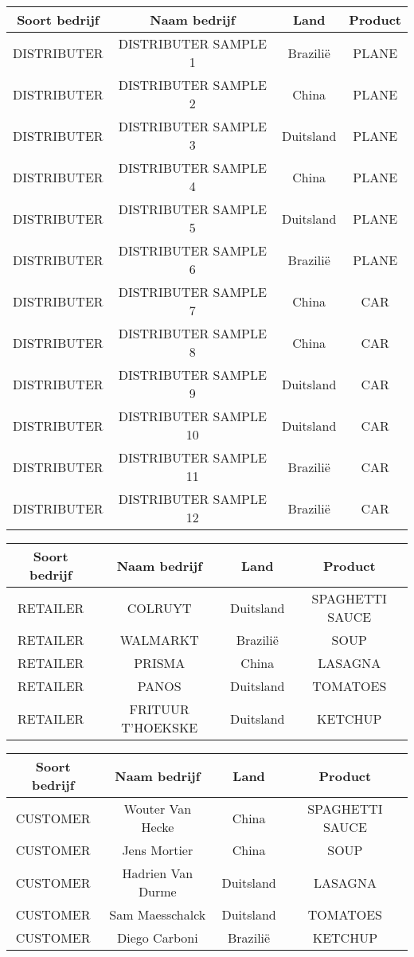 \begin{center}
	\begin{tabular}{ | c | c | c | c |}
		\hline
		\textbf{Soort bedrijf} & \textbf{Naam bedrijf} & \textbf{Land} & \textbf{Product} \\ \hline
		DISTRIBUTER & DISTRIBUTER SAMPLE 1 & Brazilië & PLANE \\ \hline
		DISTRIBUTER & DISTRIBUTER SAMPLE 2 & China & PLANE \\ \hline
		DISTRIBUTER & DISTRIBUTER SAMPLE 3 & Duitsland & PLANE \\ \hline
		DISTRIBUTER & DISTRIBUTER SAMPLE 4 & China & PLANE \\ \hline
		DISTRIBUTER & DISTRIBUTER SAMPLE 5 & Duitsland & PLANE \\ \hline
		DISTRIBUTER & DISTRIBUTER SAMPLE 6 & Brazilië & PLANE \\ \hline
		DISTRIBUTER & DISTRIBUTER SAMPLE 7 & China & CAR \\ \hline
		DISTRIBUTER & DISTRIBUTER SAMPLE 8 & China & CAR \\ \hline
		DISTRIBUTER & DISTRIBUTER SAMPLE 9 & Duitsland & CAR \\ \hline
		DISTRIBUTER & DISTRIBUTER SAMPLE 10 & Duitsland & CAR \\ \hline
		DISTRIBUTER & DISTRIBUTER SAMPLE 11 & Brazilië & CAR \\ \hline
		DISTRIBUTER & DISTRIBUTER SAMPLE 12 & Brazilië & CAR \\ \hline
	\end{tabular}
\end{center}
\begin{center}
	\begin{tabular}{ | c | c | c | c |}
		\hline
		\textbf{Soort bedrijf} & \textbf{Naam bedrijf} & \textbf{Land} & \textbf{Product} \\ \hline
		RETAILER & COLRUYT  & Duitsland & SPAGHETTI SAUCE \\ \hline
		RETAILER & WALMARKT  & Brazilië & SOUP \\ \hline
		RETAILER & PRISMA  & China & LASAGNA \\ \hline
		RETAILER & PANOS  & Duitsland & TOMATOES \\ \hline
		RETAILER & FRITUUR T'HOEKSKE  & Duitsland & KETCHUP \\ \hline
	\end{tabular}
\end{center}
\begin{center}
	\begin{tabular}{ | c | c | c | c |}
		\hline
		\textbf{Soort bedrijf} & \textbf{Naam bedrijf} & \textbf{Land} & \textbf{Product} \\ \hline
		CUSTOMER & Wouter Van Hecke  & China & SPAGHETTI SAUCE \\ \hline
		CUSTOMER & Jens Mortier  & China & SOUP \\ \hline
		CUSTOMER & Hadrien Van Durme  & Duitsland & LASAGNA \\ \hline
		CUSTOMER & Sam Maesschalck  & Duitsland & TOMATOES \\ \hline
		CUSTOMER & Diego Carboni  & Brazilië & KETCHUP \\ \hline
	\end{tabular}
\end{center}